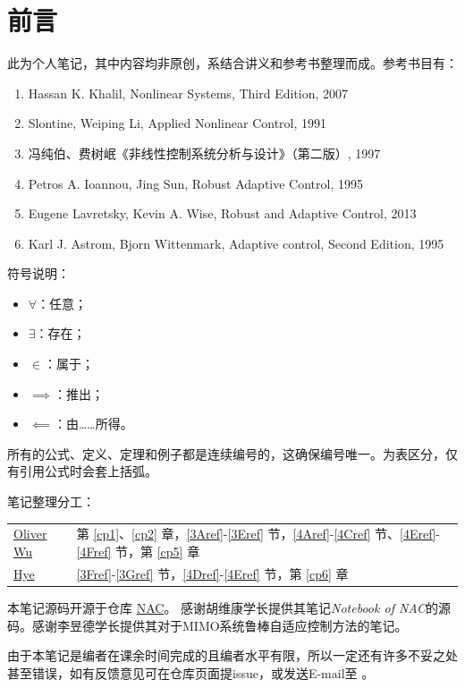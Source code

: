 \chapter*{前言}
此为个人笔记，其中内容均非原创，系结合讲义和参考书整理而成。参考书目有：
\begin{enumerate}
    \item Hassan K. Khalil, Nonlinear Systems, Third Edition, 2007
    \item Slontine, Weiping Li, Applied   Nonlinear    Control, 1991
    \item 冯纯伯、费树岷《非线性控制系统分析与设计》（第二版）, 1997
    \item Petros A. Ioannou, Jing Sun, Robust Adaptive Control, 1995
    \item Eugene Lavretsky, Kevin A. Wise, Robust and Adaptive Control, 2013
    \item Karl J. Astrom, Bjorn Wittenmark, Adaptive control, Second Edition, 1995
\end{enumerate}

符号说明：
\begin{itemize}
    \item $\forall$：任意；
    \item $\exists$：存在；
    \item $\in$：属于；
    \item $\implies$：推出；
    \item $\impliedby$：由……所得。
\end{itemize}

所有的公式、定义、定理和例子都是连续编号的，这确保编号唯一。为表区分，仅有引用公式时会套上括弧。

笔记整理分工：
\begin{table}[htbp]
  \centering
  \setcellgapes{4pt}
  \makegapedcells
  \begin{tabular}{p{2.0cm}p{12.0cm}}
    \hline
    \href{https://github.com/OliverWu515}{Oliver Wu} & 第 \ref{cp1}、\ref{cp2} 章，\ref{3Aref}-\ref{3Eref} 节，\ref{4Aref}-\ref{4Cref} 节、\ref{4Eref}-\ref{4Fref} 节，第 \ref{cp5} 章\\
    \href{https://github.com/Co-ding-Man}{Hye} & \ref{3Fref}-\ref{3Gref} 节，\ref{4Dref}-\ref{4Eref} 节，第 \ref{cp6} 章\\
    \hline
  \end{tabular}
\end{table}

本笔记源码开源于仓库 \href{https://github.com/OliverWu515/NAC}{NAC}。
感谢胡维康学长提供其笔记{\it Notebook of NAC}的源码。感谢李昱德学长提供其对于MIMO系统鲁棒自适应控制方法的笔记。

由于本笔记是编者在课余时间完成的且编者水平有限，所以一定还有许多不妥之处甚至错误，如有反馈意见可在仓库页面提issue，或发送E-mail至 。